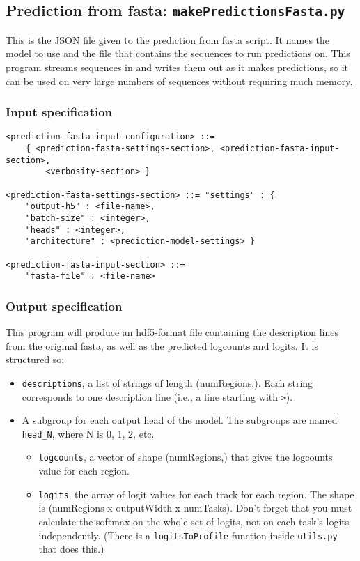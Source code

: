 \documentclass{article}
\begin{document}
\newpage

\subsection{Prediction from fasta: \texttt{makePredictionsFasta.py}}

This is the JSON file given to the prediction from fasta script. It names the model to use and
the file that contains the sequences to run predictions on.
This program streams sequences in and writes them out as it makes predictions, so it can be used
on very large numbers of sequences without requiring much memory.

\subsubsection{Input specification}

\begin{lstlisting}
<prediction-fasta-input-configuration> ::=
    { <prediction-fasta-settings-section>, <prediction-fasta-input-section>,
        <verbosity-section> }

<prediction-fasta-settings-section> ::= "settings" : {
    "output-h5" : <file-name>,
    "batch-size" : <integer>,
    "heads" : <integer>,
    "architecture" : <prediction-model-settings> }

<prediction-fasta-input-section> ::=
    "fasta-file" : <file-name>
\end{lstlisting}

\subsubsection{Output specification}

This program will produce an hdf5-format file containing the description lines from the original
fasta, as well as the predicted logcounts and logits.
It is structured so:

\begin{itemize}
    \item \texttt{descriptions}, a list of strings of length (numRegions,). Each string
        corresponds to one description line (i.e., a line starting with \texttt{>}).
    \item A subgroup for each output head of the model. The subgroups are named \texttt{head\_N},
        where N is 0, 1, 2, etc.
        \begin{itemize}
            \item \texttt{logcounts}, a vector of shape (numRegions,) that gives the logcounts
                value for each region.
            \item \texttt{logits}, the array of logit values for each track for each region.
                The shape is (numRegions x outputWidth x numTasks). Don't forget that you must
                calculate the softmax on the whole set of logits, not on each task's logits
                independently.
                (There is a \texttt{logitsToProfile} function inside \texttt{utils.py} that
                does this.)
        \end{itemize}
\end{itemize}
\end{document}
